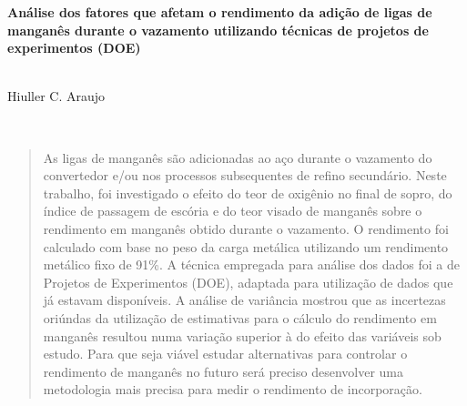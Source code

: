 \documentclass[10pt]{article}
\begin{document}
\begin{center}
{\sffamily \begin{huge}\textbf{
		Análise dos fatores que afetam o rendimento da adição de ligas de manganês durante o vazamento utilizando técnicas de projetos de experimentos (DOE)
	}\end{huge}\\[10pt]
{Hiuller C. Araujo}
}\\

	\begin{abstract}
  As ligas de manganês são adicionadas ao aço durante o vazamento do convertedor e/ou nos processos subsequentes de refino secundário. Neste trabalho, foi investigado o efeito do teor de oxigênio no final de sopro, do índice de passagem de escória e do teor visado de manganês sobre o rendimento em manganês obtido durante o vazamento. O rendimento foi calculado com base no peso da carga metálica utilizando um rendimento metálico fixo de 91\%. A técnica empregada para análise dos dados foi a de Projetos de Experimentos (DOE), adaptada para utilização de dados que já estavam disponíveis. A análise de variância mostrou que as incertezas oriúndas da utilização de estimativas para o cálculo do rendimento em manganês resultou numa variação superior à do efeito das variáveis sob estudo. Para que seja viável estudar alternativas para controlar o rendimento de manganês no futuro será preciso desenvolver uma metodologia mais precisa para medir o rendimento de incorporação.
	\end{abstract}
\end{center}





\begin{multicols}{2}

	


% 
% 
\renewcommand{\bibname}{Referências}


\end{multicols}	
\end{document}
